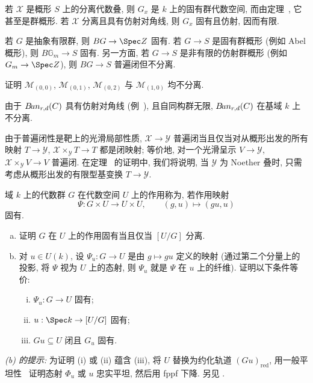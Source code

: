 若 $\mathcal X$ 是概形 $S$ 上的分离代数叠, 则 $G_x$ 是 $k$ 上的固有群代数空间, 而由定理~, 它甚至是群概形. 若 $\mathcal X$ 分离且具有仿射对角线, 则 $G_x$ 固有且仿射, 因而有限.
\begin{example}\label{src:4.8.2}
若 $G$ 是抽象有限群, 则 $BG\to\Spec\mathbb Z$ 固有. 若 $G\to S$ 是固有群概形 (例如 Abel 概形), 则 $B\mathbb G_m\to S$ 固有. 另一方面, 若 $G\to S$ 是非有限的仿射群概形 (例如 $\mathbb G_m\to\Spec\mathbb Z$), 则 $BG\to S$ 普遍闭但不分离.
\end{example}
\begin{exercise}[简单]\label{src:4.8.3}
证明 $\mathcal M_{(0,0)}$, $\mathcal M_{(0,1)}$, $\mathcal M_{(0,2)}$ 与 $\mathcal M_{(1,0)}$ 均不分离.
\end{exercise}
\begin{example}\label{src:4.8.4}
由于 $B\!un_{r,d}(C)$ 具有仿射对角线 (例~), 且自同构群无限, $B\!un_{r,d}(C)$ 在基域 $k$ 上不分离.
\end{example}
\begin{remark}\label{src:4.8.5}
由于普遍闭性是靶上的光滑局部性质, $\mathcal X\to\mathcal Y$ 普遍闭当且仅当对从概形出发的所有映射 $T\to\mathcal Y$, $\mathcal X\times_{\mathcal Y}T\to T$ 都是闭映射; 等价地, 对一个光滑呈示 $V\to\mathcal Y$, $\mathcal X\times_{\mathcal Y}V\to V$ 普遍闭. 在定理~ 的证明中, 我们将说明, 当 $\mathcal Y$ 为 Noether 叠时, 只需考虑从概形出发的有限型基变换 $T\to\mathcal Y$.
\end{remark}
\newpage
\begin{exercise}\label{src:4.8.6}
域 $k$ 上的代数群 $G$ 在代数空间 $U$ 上的作用称为, 若作用映射
\[
\Psi:G\times U\longrightarrow U\times U,\qquad(g,u)\longmapsto(gu,u)
\]
固有.
\begin{enumerate}[(a)]
\item 证明 $G$ 在 $U$ 上的作用固有当且仅当 $[U/G]$ 分离.
\item 对 $u\in U(k)$, 设 $\Psi_u:G\to U$ 是由 $g\mapsto gu$ 定义的映射 (通过第二个分量上的投影, 将 $\Psi$ 视为 $U$ 上的态射, 则 $\Psi_u$ 就是 $\Psi$ 在 $u$ 上的纤维). 证明以下条件等价:
\begin{enumerate}[(i)]
\item $\Psi_u:G\to U$ 固有;
\item $u:\Spec k\to[U/G]$ 固有;
\item $Gu\subseteq U$ 闭且 $G_u$ 固有.
\end{enumerate}
\end{enumerate}
\textit{(b) 的提示:} 为证明 (i) 或 (ii) 蕴含 (iii), 将 $U$ 替换为约化轨道 $(Gu)_{\mathrm{red}}$, 用一般平坦性~ 证明态射 $\Phi_u$ 或 $u$ 忠实平坦, 然后用 fppf 下降. 另见 \cite[引理 $0.3$]{GIT}.
\end{exercise}

